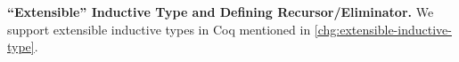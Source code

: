 



\textbf{``Extensible'' Inductive Type and Defining Recursor/Eliminator.}
We support extensible inductive types in Coq mentioned in
\ref{chg:extensible-inductive-type}.



